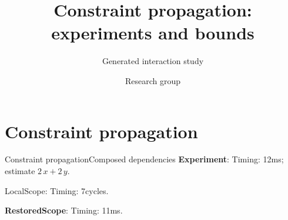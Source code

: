 \documentclass[11pt,aspectratio=43]{beamer}
\title{Constraint propagation: experiments and bounds}
\subtitle{Generated interaction study}
\author{Research group}
\date{}
\newcommand{\fuzzlayerA}[1]{\textbf{#1}}
\newcommand{\fuzzlayerB}[1]{\fuzzlayerA{#1}}
\newcommand{\fuzzlayerC}[1]{\fuzzlayerB{#1}}
\newcommand{\fuzzterm}[1]{\fuzzlayerC{#1}}
\newcommand{\fuzzpair}[2]{\fuzzterm{#1}: #2}
\newcommand{\fuzzunit}{ms}
\newcommand{\fuzzcoefficient}{2}
\newcommand{\fuzzscale}[2][\fuzzcoefficient]{#1\,#2}
\begin{document}
\section{Constraint propagation}
\begin{frame}[t,shrink=5]{Constraint propagation}{Composed dependencies}
\fuzzpair{Experiment}{Timing: 12\fuzzunit; estimate $\fuzzscale{x}+\fuzzscale[2]{y}$.}\par
{\renewcommand{\fuzzunit}{cycles}\let\fuzzterm\textrm\fuzzpair{LocalScope}{Timing: 7\fuzzunit.}\par}
\fuzzpair{RestoredScope}{Timing: 11\fuzzunit.}\par
{}
\end{frame}
\end{document}
